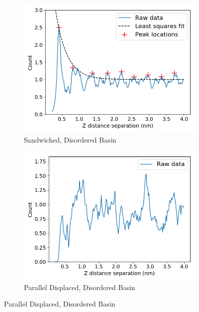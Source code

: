 \documentclass[journal=jpcbfk,manuscript=article]{achemso}
\begin{document}
\begin{figure}[!htb]
\begin{subfigure}{0.45\textwidth}
  \includegraphics[width=\textwidth]{z_correlation_sandwich_disordered.png}
  \caption{Sandwiched, Disordered Basin}\label{fig:z_correlation_sandwich_disordered}
  \end{subfigure}  
  \begin{subfigure}{0.45\textwidth}
  \centering
  \includegraphics[width=\textwidth]{z_correlation_offset_disordered.png}
  \caption{Parallel Displaced, Disordered Basin}\label{fig:z_correlation_offset_disordered}
  \end{subfigure}  

\end{figure}
\end{document}
